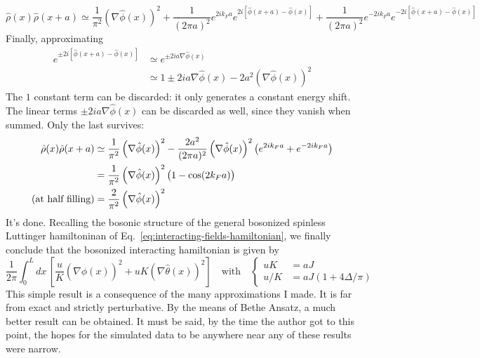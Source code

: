 \[
	\hat \rho(x) \hat \rho (x+a) \simeq \frac{1}{\pi^2} \left( \nabla \hat \phi(x) \right)^2
	+ \frac{1}{(2\pi a)^2} e^{2ik_F a} e^{2i \left[ \hat \phi(x+a) - \hat \phi(x) \right]} + \frac{1}{(2\pi a)^2} e^{-2ik_F a} e^{-2i \left[ \hat \phi(x+a) - \hat \phi(x) \right]}
\]
Finally, approximating
\[
	\begin{aligned}
		e^{\pm 2i \left[ \hat \phi(x+a) - \hat \phi(x) \right]} &\simeq e^{\pm 2ia \nabla \hat \phi(x)} \\
		&\simeq 1 \pm 2ia \nabla \hat \phi(x) - 2a^2 \left( \nabla \hat \phi(x) \right)^2
	\end{aligned}
\]
The $1$ constant term can be discarded: it only generates a constant energy shift. The linear terms $ \pm 2ia \nabla \hat \phi(x)$ can be discarded as well, since they vanish when summed. Only the last survives:
\[
	\begin{aligned}
		\hat \rho(x) \hat \rho (x+a) &\simeq \frac{1}{\pi^2} \left( \nabla \hat \phi(x) \right)^2 
		- \frac{2a^2}{(2\pi a)^2} \left( \nabla \hat \phi(x) \right)^2 \left(
			e^{2ik_F a} + e^{-2ik_F a}
		\right) \\
		&= \frac{1}{\pi^2} \left( \nabla \hat \phi(x) \right)^2 \left(
			\vphantom{A^A}
			1 - \cos(2k_F a)
		\right) \\
		\text{(at half filling)} &= \frac{2}{\pi^2} \left( \nabla \hat \phi(x) \right)^2
	\end{aligned}
\]
It's done. Recalling the bosonic structure of the general bosonized spinless Luttinger hamiltoninan of Eq.~\eqref{eq:interacting-fields-hamiltonian}, we finally conclude that the bosonized interacting hamiltonian is given by
\begin{equation}\label{eq:XXZ-luttinger-hamiltonian}
	\frac{1}{2\pi} \int_0^L dx \, \left[ \frac{u}{K} \left( \nabla \hat \phi(x) \right)^2 + uK \left( \nabla \hat \theta(x) \right)^2 \right]
	\quad\text{with}\quad
	\begin{cases}
		uK &= aJ \\
		u/K &= aJ \left(
			1 + 4\Delta/\pi
		\right)
	\end{cases}
\end{equation}
This simple result is a consequence of the many approximations I made. It is far from exact and strictly perturbative. By the means of Bethe Ansatz, a much better result can be obtained. It must be said, by the time the author got to this point, the hopes for the simulated data to be anywhere near any of these results were narrow.